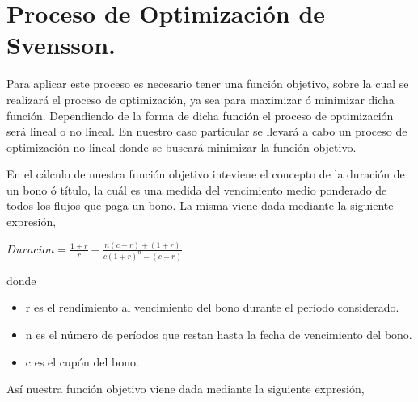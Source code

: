 
\newpage

\section{Proceso de Optimizaci\'on de Svensson.}


\hspace{0.4cm} Para aplicar este proceso es necesario tener una funci\'on objetivo, sobre la cual se realizar\'a el proceso de optimizaci\'on, ya sea para maximizar \'o minimizar dicha funci\'on. Dependiendo de la forma de dicha funci\'on el proceso de optimizaci\'on ser\'a lineal o no lineal. En nuestro caso particular se llevar\'a a cabo un proceso de optimizaci\'on no lineal donde se buscar\'a minimizar la funci\'on objetivo.


\hspace{0.4cm} En el c\'alculo de nuestra funci\'on objetivo inteviene el concepto de la duraci\'on de un bono \'o t\'itulo, la cu\'al es una medida del vencimiento medio ponderado de todos los flujos que paga un bono. La misma viene dada mediante la siguiente expresi\'on, \\

\begin{center}

$\displaystyle{Duracion = \frac{1+r}{r} - \frac{n(c-r)+(1+r)}{c(1+r)^{n}-(c-r)}}$

\end{center}


\noindent donde

\begin{itemize}
  \item r es el rendimiento al vencimiento del bono durante el per\'iodo considerado.
  \item n es el n\'umero de per\'iodos que restan hasta la fecha de vencimiento del bono.
  \item c es el cup\'on del bono.
\end{itemize}


\hspace{0.4cm} As\'i nuestra funci\'on objetivo viene dada mediante la siguiente expresi\'on,

\vspace{0.2cm}

